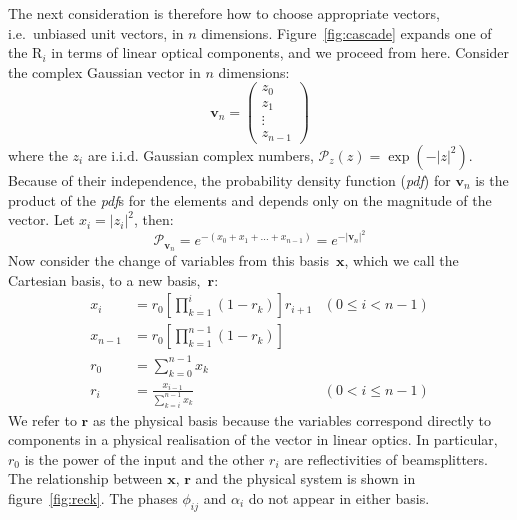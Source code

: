 \documentclass[aps,prl,twocolumn,floatfix]{revtex4}
\renewcommand{\vec}[1]{\mathbf{#1}}
\newcommand{\mat}[1]{\mathrm{#1}}
\newcommand{\of}[1]{\!\left(#1\right)}
\newcommand{\pdf}{{\it pdf}}
\newcommand{\abs}[1]{\left|#1\right|}
\newcommand{\prob}[1]{\mathcal{#1}}
\begin{document}
The next consideration is therefore how to choose appropriate vectors, i.e.\
unbiased unit vectors, in \(n\) dimensions. Figure~\ref{fig:cascade} expands one
of the \(\mat{R}_{i}\) in terms of linear optical components, and we proceed
from here. Consider the complex Gaussian vector in \(n\) dimensions:
\begin{equation}
  \vec{v}_n = \begin{pmatrix}
    z_0 \\
    z_1 \\
    \vdots \\
    z_{n-1}
  \end{pmatrix}
\end{equation}
where the \(z_i\) are i.i.d. Gaussian complex numbers, \( \prob{P}_{z} \of{z} =
\exp \left( -\abs{z}^2 \right) \). Because of their independence, the
probability density function (\pdf{}) for \(\vec{v}_n\) is the product of the
\pdf{}s for the elements and depends only on the magnitude of the vector. Let
\(x_i = \abs{z_i}^2 \), then:
\begin{equation}
  \label{eq:vec}
  \prob{P}_{\vec{v}_n} = e^{ -\left(x_0 + x_1 + \dots + x_{n-1} \right)} = e^{
  -\abs{\vec{v}_n}^2}
\end{equation}
Now consider the change of variables from this basis~\(\vec{x}\), which we call
the Cartesian basis, to a new basis,~\(\vec{r}\):
\begin{align}
  x_i &= r_0 \left[ \prod_{k=1}^{i} \left( 1-r_k \right) \right] r_{i+1} &
    \left( 0 \leq i < n-1 \right) \\
  x_{n-1} &= r_0 \left[ \prod_{k=1}^{n-1} \left( 1-r_k \right) \right] \\
  r_0 &= \sum_{k=0}^{n-1} x_k \\
  r_i &= \frac{x_{i-1}}{\sum_{k=i}^{n-1} x_k} & \left( 0 < i \leq n-1 \right)
\end{align}
We refer to \(\vec{r}\) as the physical basis because the variables
correspond directly to components in a physical realisation of the vector in
linear optics. In particular, \(r_0\) is the power of the input and the other
\(r_i\) are reflectivities of beamsplitters. The relationship between
\(\vec{x}\), \(\vec{r}\) and the physical system is shown in
figure~\ref{fig:reck}. The phases \(\phi_{ij}\) and \(\alpha_i\) do
not appear in either basis.
\end{document}
